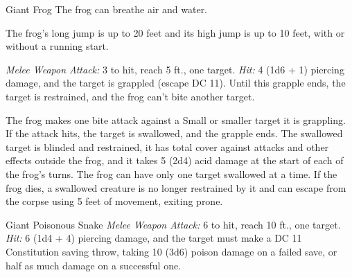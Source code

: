 \documentclass[10pt,a4paper,twoside,bg=print,twocolumn,openany,nodeprecatedcode]{dndbook}
\begin{document}
\begin{DndMonster}[float=t]{Giant Frog}
\DndMonsterBasics[
armor-class = {11},
hit-points = {\DndDice{4d8}},
speed = {30 ft., swim 30 ft.}
]
\DndMonsterAbilityScores[
 str = 12,
 dex = 13,
 con = 11,
 int = 2,
 wis = 10,
 cha = 3
]
\DndMonsterDetails[
skills = {Perception +2, Stealth +3},
senses = {darkvision 30 ft., passive perception 12},
challenge = 1/4,
]
The frog can breathe air and water.

The frog's long jump is up to 20 feet and its high jump is up to 10 feet, with or without a running start.

\textsl{Melee Weapon Attack:} 3 to hit, reach 5 ft., one target. \textsl{Hit:} 4 (1d6 + 1) piercing damage, and the target is grappled (escape DC 11). Until this grapple ends, the target is restrained, and the frog can't bite another target.

The frog makes one bite attack against a Small or smaller target it is grappling. If the attack hits, the target is swallowed, and the grapple ends. The swallowed target is blinded and restrained, it has total cover against attacks and other effects outside the frog, and it takes 5 (2d4) acid damage at the start of each of the frog's turns. The frog can have only one target swallowed at a time. If the frog dies, a swallowed creature is no longer restrained by it and can escape from the corpse using 5 feet of movement, exiting prone.

\end{DndMonster}



\begin{DndMonster}[float=t]{Giant Poisonous Snake}
\DndMonsterBasics[
armor-class = {14},
hit-points = {\DndDice{2d8 + 2}},
speed = {30 ft., swim 30 ft.}
]
\DndMonsterAbilityScores[
 str = 10,
 dex = 18,
 con = 13,
 int = 2,
 wis = 10,
 cha = 3
]
\DndMonsterDetails[
skills = {Perception +2},
senses = {blindsight 10 ft., passive perception 12},
challenge = 1/4,
]
\textsl{Melee Weapon Attack:} 6 to hit, reach 10 ft., one target. \textsl{Hit:} 6 (1d4 + 4) piercing damage, and the target must make a DC 11 Constitution saving throw, taking 10 (3d6) poison damage on a failed save, or half as much damage on a successful one.

\end{DndMonster}
\end{document}
